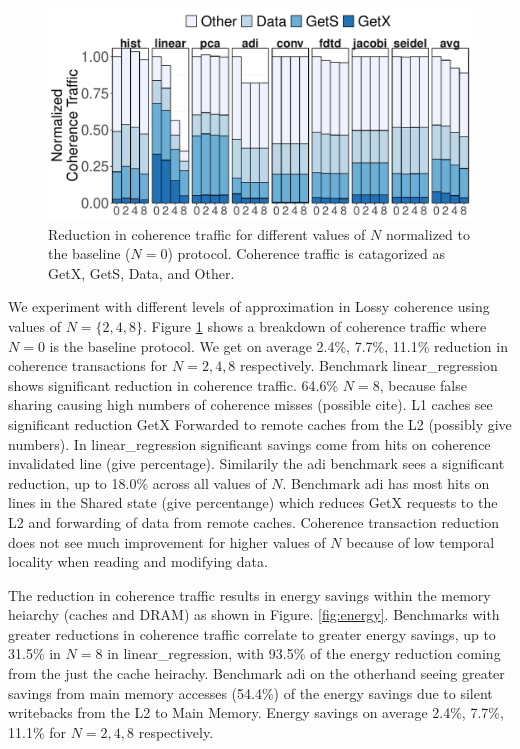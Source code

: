 \begin{figure}[t]
	\centerline{\includegraphics[scale=0.4]{graphs/coherence_saving.pdf}}
	\caption{Reduction in coherence traffic for different values of $N$ normalized to the baseline ($N = 0$) protocol. Coherence traffic is catagorized as GetX, GetS, Data, and Other.}
\label{fig:coherence_traffic}
\end{figure}

We experiment with different levels of approximation in Lossy coherence using values of $N = \{2, 4, 8\}$. Figure \ref{fig:coherence_traffic} shows a breakdown of coherence traffic where $N=0$ is the baseline protocol. We get on average 2.4\%, 7.7\%, 11.1\% reduction in coherence transactions for $N = 2, 4, 8$ respectively. Benchmark linear\_regression shows significant reduction  in coherence traffic. 64.6\%  $N = 8$, because false sharing causing high numbers of coherence misses (possible cite). L1 caches see significant reduction GetX Forwarded to remote caches from the L2 (possibly give numbers). In linear\_regression significant savings come from \storea hits on coherence invalidated line (give percentage). Similarily the adi benchmark sees a significant reduction, up to 18.0\% across all values of $N$. Benchmark adi has most \storea hits on lines in the Shared state (give percentange) which reduces GetX requests to the L2 and forwarding of data from remote caches. Coherence transaction reduction does not see much improvement for higher values of $N$ because of low temporal locality when reading and modifying data.


The reduction in coherence traffic results in energy savings within the memory heiarchy (caches and DRAM) as shown in Figure. \ref{fig:energy}. Benchmarks with greater reductions in coherence traffic correlate to greater energy savings, up to 31.5\% in $N = 8$ in linear\_regression, with 93.5\% of the energy reduction coming from the just the cache heirachy. Benchmark adi on the otherhand seeing greater savings from main memory accesses (54.4\%) of the energy savings due to silent writebacks from the L2 to Main Memory. Energy savings on average 2.4\%, 7.7\%, 11.1\% for $N = {2,4,8}$ respectively.

